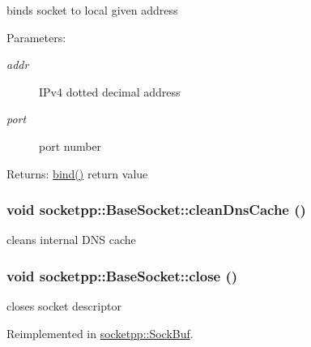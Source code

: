 \begin{CompactItemize}
binds socket to local given address 

\begin{Desc}
\item[Parameters:]
\begin{description}
\item[{\em addr}]IPv4 dotted decimal address \item[{\em port}]port number \end{description}
\end{Desc}
\begin{Desc}
\item[Returns:]\hyperlink{classsocketpp_1_1BaseSocket_78c2a8e6a5c7dfbc708c9cd637e88e51}{bind()} return value \end{Desc}
\hypertarget{classsocketpp_1_1BaseSocket_f3a4c01a7bf911460296a873ce0913da}{
\subsubsection[{cleanDnsCache}]{\setlength{\rightskip}{0pt plus 5cm}void socketpp::BaseSocket::cleanDnsCache ()}}
\label{classsocketpp_1_1BaseSocket_f3a4c01a7bf911460296a873ce0913da}


cleans internal DNS cache 

\hypertarget{classsocketpp_1_1BaseSocket_f067195056bb6b5a65c4bc1d2ac7da72}{
\subsubsection[{close}]{\setlength{\rightskip}{0pt plus 5cm}void socketpp::BaseSocket::close ()}}
\label{classsocketpp_1_1BaseSocket_f067195056bb6b5a65c4bc1d2ac7da72}


closes socket descriptor 



Reimplemented in \hyperlink{classsocketpp_1_1SockBuf_28f88c6ac0570ee5e9d57e255733b0f9}{socketpp::SockBuf}.\hypertarget{classsocketpp_1_1BaseSocket_83666b030a93368675a842a992e0c2af}{
}
\end{CompactItemize}
